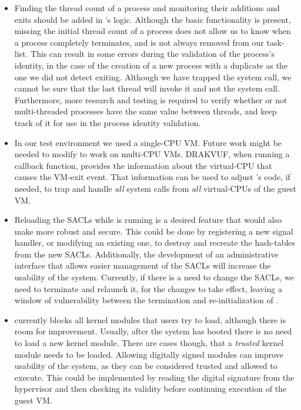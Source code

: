 \begin{itemize}

\item Finding the thread count of a process and monitoring their additions and exits should be added in 's logic. Although the basic functionality is present, missing the initial thread count of a process does not allow us to know when a process completely terminates, and is not always removed from our task-list. This can result in some errors during the validation of the process's identity, in the case of the creation of a new process with a duplicate  as the one we did not detect exiting. Although we have trapped the  system call, we cannot be sure that the last thread will invoke it and not the  system call.
Furthermore, more research and testing is required to verify whether or not multi-threaded processes have the same  value between threads, and keep track of it for use in the process identity validation.


\item In our test environment we used a single-\ac{CPU} \ac{VM}. Future work might be needed to modify  to work on multi-\ac{CPU} \acp{VM}. DRAKVUF, when running a callback function, provides the information about the virtual-\ac{CPU} that causes the \ac{VM}-exit event. That information can be used to adjust 's code, if needed, to trap and handle \emph{all} system calls from \emph{all} virtual-\acp{CPU} of the guest \ac{VM}.

\item Reloading the \acp{SACL} while  is running is a desired feature that would also make  more robust and secure. This could be done by registering a new signal handler, or modifying an existing one, to destroy and recreate the hash-tables from the new \acp{SACL}. Additionally, the development of an administrative interface that allows easier management of the \acp{SACL} will increase the usability of the system. Currently, if there is a need to change the \acp{SACL}, we need to terminate  and relaunch it, for the changes to take effect, leaving a window of vulnerability between the termination and re-initialization of . 

\item {} currently blocks all kernel modules that users try to load, although there is room for improvement. Usually, after the system has booted there is no need to load a new kernel module. There are cases though, that a \emph{trusted} kernel module needs to be loaded. Allowing digitally signed modules can improve usability of the system, as they can be considered trusted and allowed to execute. This could be implemented by reading the digital signature from the hypervisor and then checking its validity before continuing execution of the guest \ac{VM}.


\end{itemize}
